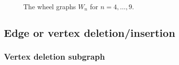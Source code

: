 \begin{figure}[!htbp]
{}
\quad
{}
\quad
{}
\caption{The wheel graphs $W_n$ for $n = 4,\dots,9$.}
\label{fig:introduction:wheel_graphs}
\end{figure}



\subsection{Edge or vertex deletion/insertion}



\subsubsection{Vertex deletion subgraph}


